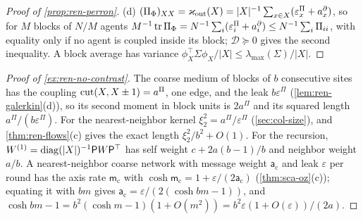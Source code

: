 \begin{proof}[Proof of \cref{prop:ren-perron}]
(d) $(\Pi_\Phi)_{XX}=\varkappa_{\mathrm{out}}(X)=\lvert X\rvert^{-1}\sum_{x\in X}(\varepsilon^\Pi_x+a^\partial_x)$, so for $M$ blocks of $N/M$ agents $M^{-1}\operatorname{tr}\Pi_\Phi=N^{-1}\sum_i(\varepsilon^\Pi_i+a^\partial_i)\le N^{-1}\sum_i\Pi_{ii}$, with equality only if no agent is coupled inside its block; $\mathcal D\succeq0$ gives the second inequality. A block average has variance $\phi_X^\top\Sigma\phi_X/\lvert X\rvert\le\lambda_{\max}(\Sigma)/\lvert X\rvert$.
\end{proof}

\begin{proof}[Proof of \cref{ex:ren-no-contrast}]
The coarse medium of blocks of $b$ consecutive sites has the coupling $\operatorname{cut}(X,X\pm1)=a^\Pi$, one edge, and the leak $b\varepsilon^\Pi$ (\cref{lem:ren-galerkin}(d)), so its second moment in block units is $2a^\Pi$ and its squared length $a^\Pi/(b\varepsilon^\Pi)$. For the nearest-neighbor kernel $\xi^2_2=a^\Pi/\varepsilon^\Pi$ (\cref{sec:col-size}), and \cref{thm:ren-flows}(c) gives the exact length $\xi^2_2/b^2+O(1)$. For the recursion, $W^{(1)}=\operatorname{diag}(\lvert X\rvert)^{-1}\mathsf PW\mathsf P^\top$ has self weight $c+2a(b-1)/b$ and neighbor weight $a/b$. A nearest-neighbor coarse network with message weight $\mathsf a_{\mathrm c}$ and leak $\varepsilon$ per round has the axis rate $\mathsf m_{\mathrm c}$ with $\cosh\mathsf m_{\mathrm c}=1+\varepsilon/(2\mathsf a_{\mathrm c})$ (\cref{thm:sca-oz}(c)); equating it with $bm$ gives $\mathsf a_{\mathrm c}=\varepsilon/(2(\cosh bm-1))$, and $\cosh bm-1=b^2(\cosh m-1)(1+O(m^2))=b^2\varepsilon(1+O(\varepsilon))/(2a)$.
\end{proof}

